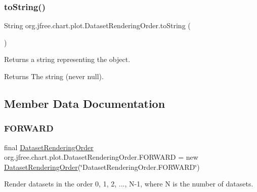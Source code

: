 \subsubsection{\texorpdfstring{to\+String()}{toString()}}
{\footnotesize\ttfamily String org.\+jfree.\+chart.\+plot.\+Dataset\+Rendering\+Order.\+to\+String (\begin{DoxyParamCaption}{ }\end{DoxyParamCaption})}

Returns a string representing the object.

\begin{DoxyReturn}{Returns}
The string (never {\ttfamily null}). 
\end{DoxyReturn}


\subsection{Member Data Documentation}
\mbox{\label{classorg_1_1jfree_1_1chart_1_1plot_1_1_dataset_rendering_order_a51d0b3e1edb8c40f874e76a0d510041a}} 
\subsubsection{\texorpdfstring{F\+O\+R\+W\+A\+RD}{FORWARD}}
{\footnotesize\ttfamily final \mbox{\hyperlink{classorg_1_1jfree_1_1chart_1_1plot_1_1_dataset_rendering_order}{Dataset\+Rendering\+Order}} org.\+jfree.\+chart.\+plot.\+Dataset\+Rendering\+Order.\+F\+O\+R\+W\+A\+RD = new \mbox{\hyperlink{classorg_1_1jfree_1_1chart_1_1plot_1_1_dataset_rendering_order}{Dataset\+Rendering\+Order}}(\char`\"{}Dataset\+Rendering\+Order.\+F\+O\+R\+W\+A\+RD\char`\"{})\hspace{0.3cm}{\ttfamily [static]}}

Render datasets in the order 0, 1, 2, ..., N-\/1, where N is the number of datasets. \mbox{\label{classorg_1_1jfree_1_1chart_1_1plot_1_1_dataset_rendering_order_ae7a6e721ca1531a5a616f7854471a5c9}} 
